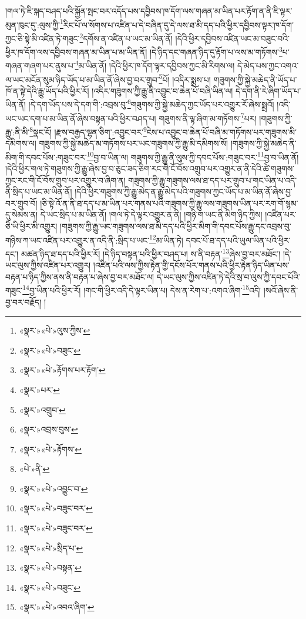 །གལ་ཏེ་ཇི་སྐད་བཤད་པའི་སྐྱོན་སྤང་བར་འདོད་པས་དབྱིབས་ཁ་དོག་ལས་གཞན་མ་ཡིན་པར་རྟོག་ན་ནི་ཇི་ལྟར་མུན་ཁུང་དུ་:ལུས་ཀྱི་\footnote{«སྣར་»«པེ་»ལུས་ཀྱིས་}རིང་པོ་ལ་སོགས་པ་འཛིན་པ་དེ་བཞིན་དུ་དེ་ལས་ཐ་མི་དད་པའི་ཕྱིར་དབྱིབས་ལྟར་ཁ་དོག་ཀྱང་ཅི་སྟེ་མི་འཛིན་ཏེ་གཟུང་\footnote{«སྣར་»«པེ་»བཟུང་}དགོས་ན་འཛིན་པ་ཡང་མ་ཡིན་ནོ། །དེའི་ཕྱིར་དབྱིབས་འཛིན་ཡང་མ་བཟུང་བའི་ཕྱིར་ཁ་དོག་ལས་དབྱིབས་གཞན་མ་ཡིན་པ་མ་ཡིན་ནོ། །དེ་ཉིད་དང་གཞན་ཉིད་དུ་རྟོག་པ་ལས་མ་གཏོགས་\footnote{«སྣར་»«པེ་»རྟོགས་པར་རྟོག་}པ་གཞན་གཞག་པར་ནུས་པ་\footnote{«སྣར་»པར་}མ་ཡིན་ནོ། །དེའི་ཕྱིར་ཁ་དོག་ལྟར་དབྱིབས་ཀྱང་མི་རིགས་ལ། དེ་མེད་པས་ཀྱང་འགའ་ལ་ཡང་མངོན་སུམ་ཉིད་ཡོད་པ་མ་ཡིན་ནོ་ཞེས་བྱ་བར་གྲུབ་\footnote{«སྣར་»འགྲུབ་}པོ། །འདིར་སྨྲས་པ། གཟུགས་ཀྱི་སྐྱེ་མཆེད་ནི་ཡོད་པ་ཁོ་ན་སྟེ་དེའི་རྒྱུ་ཡོད་པའི་ཕྱིར་རོ། །འདིར་གཟུགས་ཀྱི་རྒྱུ་ནི་འབྱུང་བ་ཆེན་པོ་བཞི་ཡིན་ལ། དེ་དག་ནི་རེ་ཞིག་ཡོད་པ་ཡིན་ནོ། །དེ་དག་ཡོད་པས་དེ་དག་གི་:འབྲས་བུ་\footnote{«སྣར་»འབྲས་བུས་}གཟུགས་ཀྱི་སྐྱེ་མཆེད་ཀྱང་ཡོད་པར་འགྱུར་རོ་ཞེས་སྨྲའོ། །འདི་ཡང་ཡང་དག་པ་མ་ཡིན་ནོ་ཞེས་བསྟན་པའི་ཕྱིར་བཤད་པ། གཟུགས་ནི་ལྟ་ཞིག་མ་གཏོགས་\footnote{«སྣར་»«པེ་»རྟོགས་}པར། །གཟུགས་ཀྱི་རྒྱུ་:ནི་མི་\footnote{«པེ་»ནི་}སྣང་ངོ། །རྫས་བརྒྱད་ལྷན་ཅིག་:འབྱུང་བར་\footnote{«སྣར་»«པེ་»འབྱུང་བ་}ངེས་པ་འབྱུང་བ་ཆེན་པོ་བཞི་མ་གཏོགས་པར་གཟུགས་མི་དམིགས་ལ། གཟུགས་ཀྱི་སྐྱེ་མཆེད་མ་གཏོགས་པར་ཡང་གཟུགས་ཀྱི་རྒྱུ་མི་དམིགས་སོ། །གཟུགས་ཀྱི་སྐྱེ་མཆེད་ནི་མིག་གི་དབང་པོས་:གཟུང་བར་\footnote{«སྣར་»«པེ་»བཟུང་བར་}བྱ་བ་ཡིན་ལ། གཟུགས་ཀྱི་རྒྱུ་ནི་ལུས་ཀྱི་དབང་པོས་:གཟུང་བར་\footnote{«སྣར་»«པེ་»བཟུང་བར་}བྱ་བ་ཡིན་ནོ། །དེའི་ཕྱིར་གལ་ཏེ་གཟུགས་ཀྱི་རྒྱུ་ཞེས་བྱ་བ་ཅུང་ཟད་ཅིག་རང་གི་ངོ་བོས་འགྲུབ་པར་འགྱུར་ན་ནི་དེའི་ཚེ་གཟུགས་ཀྱང་རང་གི་ངོ་བོས་གྲུབ་པར་འགྱུར་བ་ཞིག་ན། གཟུགས་ཀྱི་རྒྱུ་གཟུགས་ལས་ཐ་དད་པར་གྲུབ་པ་གང་ཡིན་པ་འདི་ནི་སྲིད་པ་ཡང་མ་ཡིན་ནོ། །དེའི་ཕྱིར་གཟུགས་ཀྱི་རྒྱུ་མེད་ན་རྒྱུ་མེད་པའི་གཟུགས་ཀྱང་ཡོད་པ་མ་ཡིན་ནོ་ཞེས་བྱ་བར་གྲུབ་བོ། །ཅི་སྟེ་འོ་ན་ནི་ཐ་དད་པ་མ་ཡིན་པར་གནས་པའི་གཟུགས་ཀྱི་རྒྱུ་ལས་གཟུགས་ཡིན་པར་རག་གོ་སྙམ་དུ་སེམས་ན། དེ་ཡང་སྲིད་པ་མ་ཡིན་ནོ། །གལ་ཏེ་དེ་ལྟར་འགྱུར་ན་ནི། །གཉི་ག་ཡང་ནི་མིག་ཉིད་ཀྱིས། །འཛིན་པར་ཅི་ཡི་ཕྱིར་མི་འགྱུར། །གཟུགས་ཀྱི་རྒྱུ་ཡང་གཟུགས་ལས་ཐ་མི་དད་པའི་ཕྱིར་མིག་གི་དབང་པོས་རྒྱུ་དང་འབྲས་བུ་གཉིས་ཀ་ཡང་འཛིན་པར་འགྱུར་ན་འདི་ནི་:སྲིད་པ་ཡང་\footnote{«སྣར་»«པེ་»སྲིད་པ་}མ་ཡིན་ཏེ། དབང་པོ་ཐ་དད་པའི་ཡུལ་ཡིན་པའི་ཕྱིར་དང་། མཚན་ཉིད་ཐ་དད་པའི་ཕྱིར་རོ། །དེ་ཉིད་བསྟན་པའི་ཕྱིར་བཤད་པ། ས་ནི་བརྟན་\footnote{«སྣར་»«པེ་»བསྟན་}ཞེས་བྱ་བར་མཐོང་། །དེ་ཡང་ལུས་ཀྱིས་འཛིན་པར་འགྱུར། །འཛིན་པའི་ལས་ཀྱིས་རྟེན་གྱི་དངོས་པོར་གནས་པའི་ཕྱིར་རྟེན་ཉིད་ཡིན་པས་བརྟན་པ་ཉིད་ཀྱིས་ནས་ནི་བརྟན་པ་ཞེས་བྱ་བར་མཐོང་ལ། དེ་ཡང་ལུས་ཀྱིས་འཛིན་ཏེ་དེའི་སྲ་བ་ལུས་ཀྱི་དབང་པོའི་གཟུང་\footnote{«སྣར་»«པེ་»བཟུང་}བྱ་ཡིན་པའི་ཕྱིར་རོ། །གང་གི་ཕྱིར་འདི་དེ་ལྟར་ཡིན་པ། དེས་ན་རེག་པ་:འགའ་ཞིག་\footnote{«སྣར་»«པེ་»འབའ་ཞིག་}འདི། །སའོ་ཞེས་ནི་བྱ་བར་བརྗོད། །
